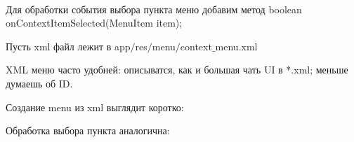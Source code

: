     \pagebreak

\\

    Для обработки события выбора пункта меню добавим метод
    boolean onContextItemSelected(MenuItem item);
 


    Пусть xml файл лежит в app$/$res$/$menu$/$context$\_$menu.xml

    \pagebreak

    XML меню часто удобней: описыватся, как и большая чать UI в *.xml; меньше думаешь об ID.

    Создание menu из xml выглядит коротко:


    Обработка выбора пункта аналогична:

